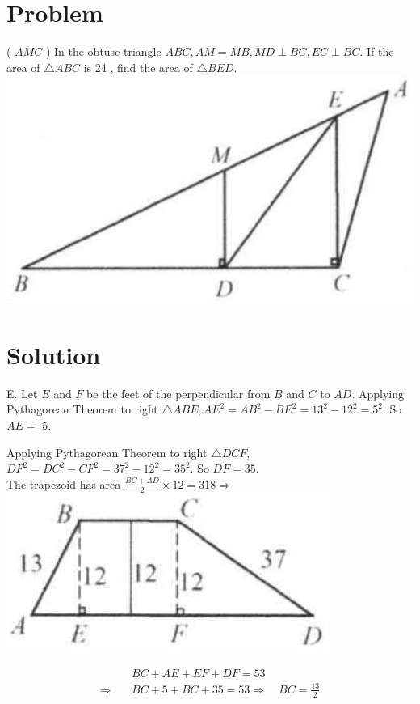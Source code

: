 \documentclass{article}
\begin{document}
\section*{Problem}
( \(A M C\) ) In the obtuse triangle \(A B C, A M=M B, M D \perp B C, E C \perp B C\). If the area of \(\triangle A B C\) is 24 , find the area of \(\triangle B E D\).\\
\centering
\includegraphics[width=\textwidth]{images/015.jpg}

\section*{Solution}
E.
Let \(E\) and \(F\) be the feet of the perpendicular from \(B\) and \(C\) to \(A D\). Applying\\
Pythagorean Theorem to right \(\triangle A B E, A E^{2}=A B^{2}-B E^{2}=13^{2}-12^{2}=5^{2}\). So \(A E=\) 5.

Applying Pythagorean Theorem to right \(\triangle D C F\), \(D F^{2}=D C^{2}-C F^{2}=37^{2}-12^{2}=35^{2}\). So \(D F=35\).\\
The trapezoid has area \(\frac{B C+A D}{2} \times 12=318 \Rightarrow\)\\
\centering
\includegraphics[width=\textwidth]{images/093(3).jpg}

\[
\begin{aligned}
& B C+A E+E F+D F=53 \\
\Rightarrow \quad & B C+5+B C+35=53 \Rightarrow \quad B C=\frac{13}{2}
\end{aligned}
\]
\end{document}
